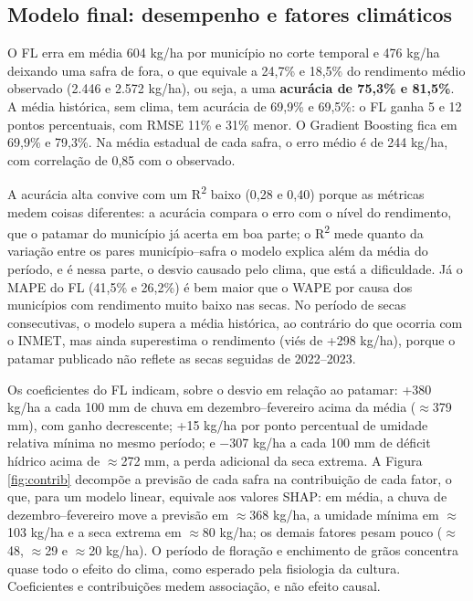 \documentclass[
	article,			%
	11pt,				%
	oneside,			%
	a4paper,			%
	english,			%
	brazil,				%
	sumario=tradicional
	]{abntex2}
\begin{document}
\subsection{Modelo final: desempenho e fatores climáticos}

O FL erra em média 604 kg/ha por município no corte temporal e 476 kg/ha deixando uma safra de fora, o que equivale a 24,7\% e 18,5\% do rendimento médio observado (2.446 e 2.572 kg/ha), ou seja, a uma \textbf{acurácia de 75,3\% e 81,5\%}. A média histórica, sem clima, tem acurácia de 69,9\% e 69,5\%: o FL ganha 5 e 12 pontos percentuais, com RMSE 11\% e 31\% menor. O Gradient Boosting fica em 69,9\% e 79,3\%. Na média estadual de cada safra, o erro médio é de 244 kg/ha, com correlação de 0,85 com o observado.

A acurácia alta convive com um R\textsuperscript{2} baixo (0,28 e 0,40) porque as métricas medem coisas diferentes: a acurácia compara o erro com o nível do rendimento, que o patamar do município já acerta em boa parte; o R\textsuperscript{2} mede quanto da variação entre os pares município--safra o modelo explica além da média do período, e é nessa parte, o desvio causado pelo clima, que está a dificuldade. Já o MAPE do FL (41,5\% e 26,2\%) é bem maior que o WAPE por causa dos municípios com rendimento muito baixo nas secas. No período de secas consecutivas, o modelo supera a média histórica, ao contrário do que ocorria com o INMET, mas ainda superestima o rendimento (viés de +298 kg/ha), porque o patamar publicado não reflete as secas seguidas de 2022--2023.

Os coeficientes do FL indicam, sobre o desvio em relação ao patamar: +380 kg/ha a cada 100 mm de chuva em dezembro--fevereiro acima da média ($\approx$379 mm), com ganho decrescente; +15 kg/ha por ponto percentual de umidade relativa mínima no mesmo período; e $-$307 kg/ha a cada 100 mm de déficit hídrico acima de $\approx$272 mm, a perda adicional da seca extrema. A Figura \ref{fig:contrib} decompõe a previsão de cada safra na contribuição de cada fator, o que, para um modelo linear, equivale aos valores SHAP: em média, a chuva de dezembro--fevereiro move a previsão em $\approx$368 kg/ha, a umidade mínima em $\approx$103 kg/ha e a seca extrema em $\approx$80 kg/ha; os demais fatores pesam pouco ($\approx$48, $\approx$29 e $\approx$20 kg/ha). O período de floração e enchimento de grãos concentra quase todo o efeito do clima, como esperado pela fisiologia da cultura. Coeficientes e contribuições medem associação, e não efeito causal.
\end{document}
